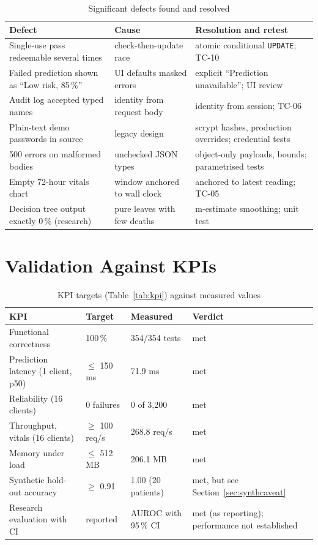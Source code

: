 \begin{table}[!htbp]
\centering
\caption{Significant defects found and resolved}
\label{tab:defects}
\small
\begin{tabularx}{\textwidth}{@{}lYY@{}}
\toprule
Defect & Cause & Resolution and retest\\
\midrule
Single-use pass redeemable several times & check-then-update race & atomic conditional \texttt{UPDATE}; TC-10\\
Failed prediction shown as ``Low risk, 85\,\%'' & UI defaults masked errors & explicit ``Prediction unavailable''; UI review\\
Audit log accepted typed names & identity from request body & identity from session; TC-06\\
Plain-text demo passwords in source & legacy design & scrypt hashes, production overrides; credential tests\\
500 errors on malformed bodies & unchecked JSON types & object-only payloads, bounds; parametrised tests\\
Empty 72-hour vitals chart & window anchored to wall clock & anchored to latest reading; TC-05\\
Decision tree output exactly 0\,\% (research) & pure leaves with few deaths & m-estimate smoothing; unit test\\
\bottomrule
\end{tabularx}
\end{table}

\section{Validation Against KPIs}
\begin{table}[!htbp]
\centering
\caption{KPI targets (Table~\ref{tab:kpi}) against measured values}
\label{tab:kpivalid}
\small
\begin{tabularx}{\textwidth}{@{}lllY@{}}
\toprule
KPI & Target & Measured & Verdict\\
\midrule
Functional correctness & 100\,\% & 354/354 tests & met\\
Prediction latency (1 client, p50) & $\le$ 150 ms & 71.9 ms & met\\
Reliability (16 clients) & 0 failures & 0 of 3{,}200 & met\\
Throughput, vitals (16 clients) & $\ge$ 100 req/s & 268.8 req/s & met\\
Memory under load & $\le$ 512 MB & 206.1 MB & met\\
Synthetic hold-out accuracy & $\ge$ 0.91 & 1.00 (20 patients) & met, but see Section~\ref{sec:synthcaveat}\\
Research evaluation with CI & reported & AUROC with 95\,\% CI & met (as reporting); performance not established\\
\bottomrule
\end{tabularx}
\end{table}

